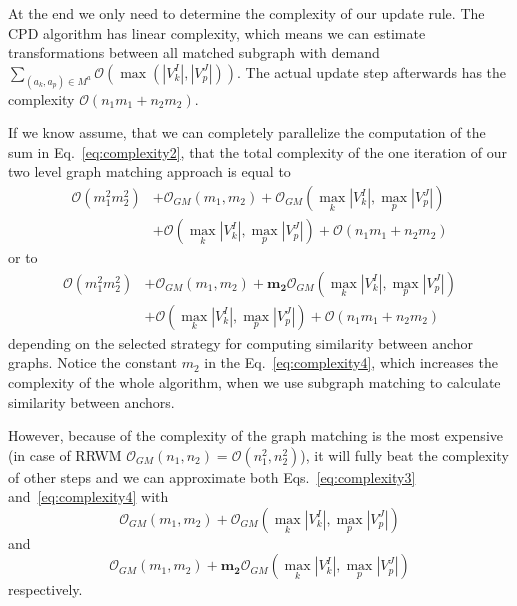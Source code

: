 At the end we only need to determine the complexity of our update rule. The CPD algorithm has linear complexity, which means we can estimate transformations between all matched subgraph with demand $\sum_{(a_k,a_p)\in M^a}\mathcal{O}(\max(|V^I_k|,|V^J_p|))$. The actual update step afterwards has the complexity $\mathcal{O}(n_1m_1+n_2m_2)$.

If we know assume, that we can completely parallelize the computation of the sum in Eq.~\eqref{eq:complexity2}, that the total complexity of the one iteration of our two level graph matching approach is equal to
\begin{equation}\label{eq:complexity3}
\begin{split}
\mathcal{O}(m_1^2m_2^2)&+\mathcal{O}_{GM}(m_1,m_2)+\mathcal{O}_{GM}(\max_{k}|V^I_k|,\max_{p}|V^J_p|)\\
                       &+\mathcal{O}(\max_{k}|V^I_k|,\max_{p}|V^J_p|)+\mathcal{O}(n_1m_1+n_2m_2)
\end{split}
\end{equation}
or to
\begin{equation}\label{eq:complexity4}
\begin{split}
\mathcal{O}(m_1^2m_2^2)&+\mathcal{O}_{GM}(m_1,m_2)+\mathbf{m_2}\mathcal{O}_{GM}(\max_{k}|V^I_k|,\max_{p}|V^J_p|)\\
&+\mathcal{O}(\max_{k}|V^I_k|,\max_{p}|V^J_p|)+\mathcal{O}(n_1m_1+n_2m_2)
\end{split}
\end{equation}
depending on the selected strategy for computing similarity between anchor graphs. Notice the constant $m_2$ in the Eq.~\eqref{eq:complexity4}, which increases the complexity of the whole algorithm, when we use subgraph matching to calculate similarity between anchors.

However, because of the complexity of the graph matching is the most expensive (in case of RRWM $\mathcal{O}_{GM}(n_1,n_2)=\mathcal{O}(n_1^2,n_2^2)$), it will fully beat the complexity of other steps and we can approximate both Eqs.~\eqref{eq:complexity3} and~\eqref{eq:complexity4} with
\begin{equation}\label{eq:complexity3.1}
\mathcal{O}_{GM}(m_1,m_2)+\mathcal{O}_{GM}(\max_{k}|V^I_k|,\max_{p}|V^J_p|)
\end{equation} 
and 
\begin{equation}\label{eq:complexity4.1}
\mathcal{O}_{GM}(m_1,m_2)+\mathbf{m_2}\mathcal{O}_{GM}(\max_{k}|V^I_k|,\max_{p}|V^J_p|)
\end{equation}
respectively.

